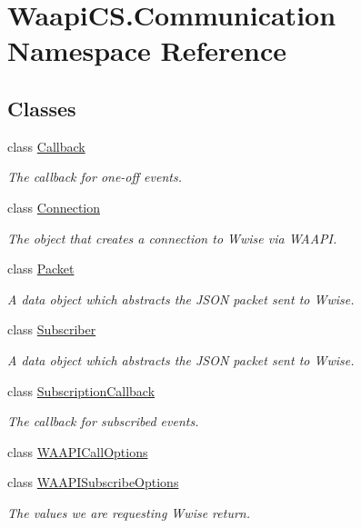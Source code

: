 \hypertarget{namespace_waapi_c_s_1_1_communication}{}\section{Waapi\+C\+S.\+Communication Namespace Reference}
\label{namespace_waapi_c_s_1_1_communication}
\subsection*{Classes}
\begin{DoxyCompactItemize}
\item 
class \mbox{\hyperlink{class_waapi_c_s_1_1_communication_1_1_callback}{Callback}}
\begin{DoxyCompactList}\small\item\em The callback for one-\/off events. \end{DoxyCompactList}\item 
class \mbox{\hyperlink{class_waapi_c_s_1_1_communication_1_1_connection}{Connection}}
\begin{DoxyCompactList}\small\item\em The object that creates a connection to Wwise via W\+A\+A\+PI. \end{DoxyCompactList}\item 
class \mbox{\hyperlink{class_waapi_c_s_1_1_communication_1_1_packet}{Packet}}
\begin{DoxyCompactList}\small\item\em A data object which abstracts the J\+S\+ON packet sent to Wwise. \end{DoxyCompactList}\item 
class \mbox{\hyperlink{class_waapi_c_s_1_1_communication_1_1_subscriber}{Subscriber}}
\begin{DoxyCompactList}\small\item\em A data object which abstracts the J\+S\+ON packet sent to Wwise. \end{DoxyCompactList}\item 
class \mbox{\hyperlink{class_waapi_c_s_1_1_communication_1_1_subscription_callback}{Subscription\+Callback}}
\begin{DoxyCompactList}\small\item\em The callback for subscribed events. \end{DoxyCompactList}\item 
class \mbox{\hyperlink{class_waapi_c_s_1_1_communication_1_1_w_a_a_p_i_call_options}{W\+A\+A\+P\+I\+Call\+Options}}
\item 
class \mbox{\hyperlink{class_waapi_c_s_1_1_communication_1_1_w_a_a_p_i_subscribe_options}{W\+A\+A\+P\+I\+Subscribe\+Options}}
\begin{DoxyCompactList}\small\item\em The values we are requesting Wwise return. \end{DoxyCompactList}\end{DoxyCompactItemize}
